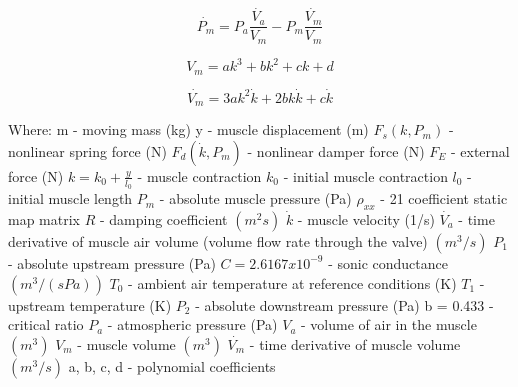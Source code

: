\documentclass[11pt,a4paper]{article}
\begin{document}
\begin{appendices}
\begin{equation}
    \dot{P_m} = P_a\frac{\dot{V_a}}{V_m}-P_m\frac{\dot{V_m}}{V_m}
\end{equation}

\begin{equation}
    V_m = ak^3 + bk^2 + ck + d
\end{equation}

\begin{equation}
    \dot{V_m} = 3ak^2\dot{k} + 2bk\dot{k} + c\dot{k}
\end{equation}

Where: \newline
m - moving mass (kg)\newline
y - muscle displacement (m)\newline
$F_s(k, P_m)$ - nonlinear spring force (N)\newline
$F_d(\dot{k}, P_m)$ - nonlinear damper force (N)\newline
$F_E$ - external force (N)\newline
$k = k_0 + \frac{y}{l_0}$ - muscle contraction\newline
$k_0$ - initial muscle contraction\newline
$l_0$ - initial muscle length\newline
$P_m$ - absolute muscle pressure (Pa)\newline
$\rho_{xx}$ - 21 coefficient static map matrix\newline
$R$ - damping coefficient $(m^2s)$\newline
$\dot{k}$ - muscle velocity (1/s)\newline
$\dot{V_a}$ - time derivative of muscle air volume (volume flow rate through the valve) $(m^3/s)$
$P_1$ - absolute upstream pressure (Pa)\newline
$C = 2.6167x10^{-9}$ - sonic conductance $(m^3/(sPa))$\newline
$T_0$ - ambient air temperature at reference conditions (K)\newline
$T_1$ - upstream temperature (K)\newline
$P_2$ - absolute downstream pressure (Pa)\newline
b = 0.433 - critical ratio\newline
$P_a$ - atmospheric pressure (Pa)\newline
$V_a$ - volume of air in the muscle $(m^3)$\newline
$V_m$ - muscle volume $(m^3)$\newline
$\dot{V_m}$ - time derivative of muscle volume $(m^3/s)$\newline
a, b, c, d - polynomial coefficients


\end{appendices}
\end{document}
